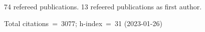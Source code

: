74 refereed publications. 13 refeered publications as first author.

Total citations~=~3077; h-index~=~31 (2023-01-26)